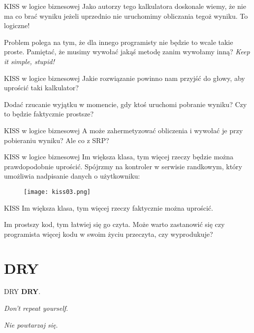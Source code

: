 \begin{frame}{KISS w logice biznesowej}
	Jako autorzy tego kalkulatora doskonale wiemy, że nie ma co brać wyniku jeżeli uprzednio nie uruchomimy obliczania tegoż wyniku. To logiczne!
	
	Problem polega na tym, że dla innego programisty nie będzie to wcale takie proste. Pamiętać, że musimy wywołać jakąś metodę zanim wywołamy inną? \emph{Keep it simple, stupid!}
\end{frame}

\begin{frame}{KISS w logice biznesowej}
	Jakie rozwiązanie powinno nam przyjść do głowy, aby uprościć taki kalkulator?
	
	Dodać rzucanie wyjątku w momencie, gdy ktoś uruchomi pobranie wyniku? Czy to będzie faktycznie prostsze?
\end{frame}

\begin{frame}{KISS w logice biznesowej}
	A może zahermetyzować obliczenia i wywołać je przy pobieraniu wyniku? Ale co z SRP?
\end{frame}

\begin{frame}{KISS w logice biznesowej}
	Im większa klasa, tym więcej rzeczy będzie można prawdopodobnie uprościć. Spójrzmy na kontroler w serwisie randkowym, który umożliwia nadpisanie danych o użytkowniku:
\end{frame}

\begin{frame}
	\begin{figure} \centering
		\texttt{[image: kiss03.png]}
	\end{figure}
\end{frame}

\begin{frame}{KISS}
	Im większa klasa, tym więcej rzeczy faktycznie można uprościć.
	
	Im prostszy kod, tym łatwiej się go czyta. Może warto zastanowić się czy programista więcej kodu w swoim życiu przeczyta, czy wyprodukuje?
\end{frame}

\section{DRY}

\begin{frame}{DRY}
	\textbf{DRY}.
	
	\emph{Don't repeat yourself}.
	
	\emph{Nie powtarzaj się}.
\end{frame}

